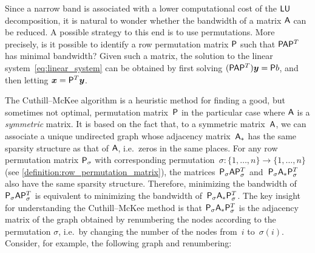 Since a narrow band is associated with a lower computational cost of the $\mathsf L \mathsf U$ decomposition,
it is natural to wonder whether the bandwidth of a matrix $\mathsf A$ can be reduced.
A possible strategy to this end is to use permutations.
More precisely, is it possible to identify a row permutation matrix $\mathsf P$ such that
\(
    \mathsf P \mathsf A \mathsf P^T
\)
has minimal bandwidth?
Given such a matrix,
the solution to the linear system~\eqref{eq:linear_system} can be obtained by first solving $(\mathsf P \mathsf A \mathsf P^T) \mathbf{\boldsymbol{y}} = \mathsf P b$,
and then letting $\mathbf{\boldsymbol{x}} = \mathsf P^T \mathbf{\boldsymbol{y}}$.

The Cuthill--McKee algorithm is a heuristic method for finding a good,
but sometimes not optimal,
permutation matrix~$\mathsf P$ in the particular case where $\mathsf A$ is a \emph{symmetric} matrix.
It is based on the fact that,
to a symmetric matrix~$\mathsf A$, we can associate a unique undirected graph whose adjacency matrix~$\mathsf A_*$ has the same sparsity structure as that of $\mathsf A$,
i.e.\ zeros in the same places.
For any row permutation matrix $\mathsf P_{\sigma}$ with corresponding permutation~$\sigma\colon \{1, \dotsc, n\} \rightarrow \{1, \dotsc, n\}$ (see \cref{definition:row_permutation_matrix}),
the matrices~$\mathsf P_{\sigma} \mathsf A \mathsf P_{\sigma}^T$ and~$\mathsf P_{\sigma} \mathsf A_* \mathsf P_{\sigma}^T$ also have the same sparsity structure.
Therefore, minimizing the bandwidth of~$\mathsf P_{\sigma} \mathsf A \mathsf P_{\sigma}^T$ is equivalent to minimizing the bandwidth of~$\mathsf P_{\sigma} \mathsf A_* \mathsf P_{\sigma}^T$.
The key insight for understanding the Cuthill--McKee method is that $\mathsf P_{\sigma} \mathsf A_* \mathsf P_{\sigma}^T$ is the adjacency matrix of the graph obtained by renumbering the nodes
according to the permutation $\sigma$,
i.e.\ by changing the number of the nodes from~$i$ to~$\sigma(i)$.
Consider, for example,
the following graph and renumbering:

